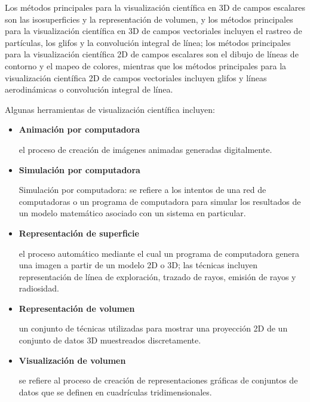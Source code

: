         Los métodos principales para la visualización científica en 3D de campos escalares son las isosuperficies y la representación de volumen, y los métodos principales para la visualización científica en 3D de campos vectoriales incluyen el rastreo de partículas, los glifos y la convolución integral de línea; los métodos principales para la visualización científica 2D de campos escalares son el dibujo de líneas de contorno y el mapeo de colores, mientras que los métodos principales para la visualización científica 2D de campos vectoriales incluyen glifos y líneas aerodinámicas o convolución integral de línea.
        
        Algunas herramientas de visualización científica incluyen:

        \begin{itemize}

            \item \textbf{Animación por computadora} 

            el proceso de creación de imágenes animadas generadas digitalmente. \hfill 

            \item \textbf{Simulación por computadora} 

            Simulación por computadora: se refiere a los intentos de una red de computadoras o un programa de computadora para simular los resultados de un modelo matemático asociado con un sistema en particular. \hfill 

            \item \textbf{Representación de superficie} 

            el proceso automático mediante el cual un programa de computadora genera una imagen a partir de un modelo 2D o 3D; las técnicas incluyen representación de línea de exploración, trazado de rayos, emisión de rayos y radiosidad. \hfill 

            \item \textbf{Representación de volumen} 

            un conjunto de técnicas utilizadas para mostrar una proyección 2D de un conjunto de datos 3D muestreados discretamente. \hfill 

            \item \textbf{Visualización de volumen} 

            se refiere al proceso de creación de representaciones gráficas de conjuntos de datos que se definen en cuadrículas tridimensionales. \hfill 

        \end{itemize}

